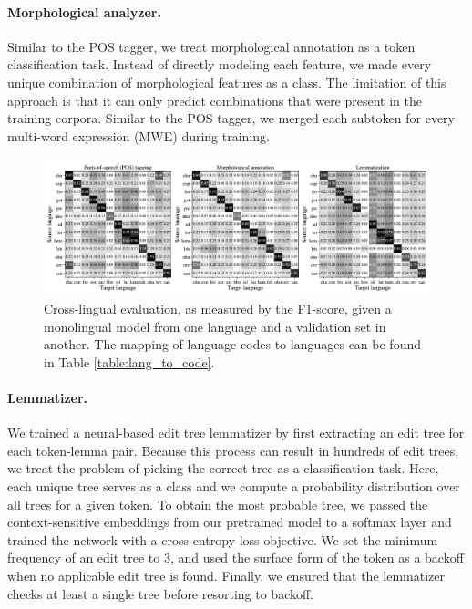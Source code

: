 \documentclass[11pt]{article}
\begin{document}
\paragraph{Morphological analyzer.}
Similar to the POS tagger, we treat morphological annotation as a token classification task.
Instead of directly modeling each feature, we made every unique combination of morphological features as a class.
The limitation of this approach is that it can only predict combinations that were present in the training corpora.
Similar to the POS tagger, we merged each subtoken for every multi-word expression (MWE) during training.

\begin{figure}[t]
  \centering
  \includegraphics[width=\textwidth]{figures/cross_lingual.pdf}
  \caption{
    Cross-lingual evaluation, as measured by the F1-score, given a monolingual model from one language and a validation set in another.
    The mapping of language codes to languages can be found in Table \ref{table:lang_to_code}.
  }
  \label{fig:cross_lingual}
\end{figure}

\paragraph{Lemmatizer.}
We trained a neural-based edit tree lemmatizer \cite{muller-etal-2015-joint} by first extracting an edit tree for each token-lemma pair.
Because this process can result in hundreds of edit trees, we treat the problem of picking the correct tree as a classification task.
Here, each unique tree serves as a class and we compute a probability distribution over all trees for a given token.
To obtain the most probable tree, we passed the context-sensitive embeddings from our pretrained model to a softmax layer and trained the network with a cross-entropy loss objective.
We set the minimum frequency of an edit tree to 3, and used the surface form of the token as a backoff when no applicable edit tree is found.
Finally, we ensured that the lemmatizer checks at least a single tree before resorting to backoff.
\end{document}
